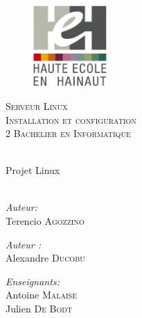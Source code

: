 \begin{center}
  
  \begin{figure}[!h]
    \centering
    \includegraphics[width=0.25\textwidth]{textures/logo/heh.eps}
  \end{figure}

  \textsc{\LARGE Serveur Linux} \\ [0.5cm]
  \textsc{\Large Installation et configuration} \\ [0.5cm]

  \textsc{\large 2 Bachelier en Informatique} \\ [0.2cm]

  \begingroup
   \selectfont 

  \HRule \\ [0.4cm] {
    \huge Projet Linux \\ [0.2cm] 
  }
  \HRule \\ [1.3cm]
  \endgroup

  \begin{minipage}[t]{0.4 \textwidth} 
    \begin{flushleft} 
      \large \emph{Auteur:} \\ 
      Terencio \textsc{Agozzino}
    \end{flushleft} 
  \end{minipage}
  \begin{minipage}[t]{0.4 \textwidth}
    \begin{flushright} 
      \large \emph{Auteur :} \\ 
      Alexandre \textsc{Ducobu}
    \end{flushright} 
  \end{minipage}

  \vspace{1.5cm}

  \begin{minipage}[t]{0.4 \textwidth}
    \begin{center} 
      \large \emph{Enseignants:} \\ 
      Antoine \textsc{Malaise} \\
      Julien \textsc{De Bodt}
    \end{center} 
  \end{minipage}


\end{center}
